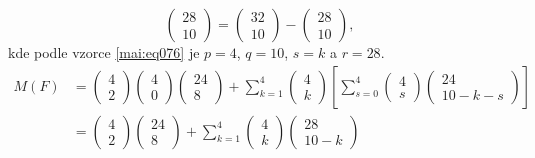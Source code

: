 \begin{example}
\begin{equation*}
                        \begin{pmatrix} 28 \\ 10    \end{pmatrix} =
                        \begin{pmatrix} 32 \\ 10    \end{pmatrix} -
                        \begin{pmatrix} 28 \\ 10    \end{pmatrix},
    \end{equation*}
    kde podle vzorce \ref{mai:eq076} je \(p=4\), \(q=10\), \(s=k\) a \(r=28\).  
    \begin{align*}
      M(F) &= \begin{pmatrix}  4 \\ 2 \end{pmatrix}\begin{pmatrix}  4 \\ 0 \end{pmatrix} 
              \begin{pmatrix} 24 \\ 8 \end{pmatrix} + 
              \sum^{4}_{k=1}\begin{pmatrix} 4  \\ k \end{pmatrix}
                      \left[\sum^{4}_{s=0}\begin{pmatrix}  4 \\ s \end{pmatrix}
                            \begin{pmatrix} 24 \\ 10 - k - s \end{pmatrix}
                      \right]                                                                   \\
           &= \begin{pmatrix}  4 \\ 2 \end{pmatrix}\begin{pmatrix} 24 \\ 8 \end{pmatrix} +
              \sum^{4}_{k=1}\begin{pmatrix}  4 \\ k \end{pmatrix}
                            \begin{pmatrix} 28 \\ 10 - k \end{pmatrix}                          \\

\end{align*}
\end{example}

